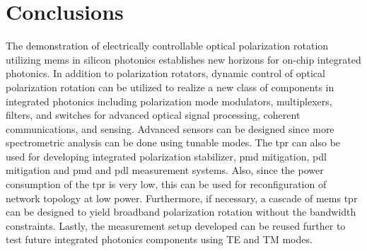 \documentclass[../report.tex]{subfiles}
\begin{document}
		
\chapter{Conclusions}

The demonstration of electrically controllable optical polarization rotation utilizing \gls{mems} in silicon photonics establishes new horizons for on-chip integrated photonics. In addition to polarization rotators, dynamic control of optical polarization rotation can be utilized to realize a new class of components in integrated photonics including polarization mode modulators, multiplexers, filters, and switches for advanced optical signal processing, coherent communications, and sensing. Advanced sensors can be designed since more spectrometric analysis can be done using tunable modes. The \gls{tpr} can also be used for developing integrated polarization stabilizer, \gls{pmd} mitigation, \gls{pdl} mitigation and \gls{pmd} and \gls{pdl} measurement systems. Also, since the power consumption of the \gls{tpr} is very low, this can be used for reconfiguration of network topology at low power. Furthermore, if necessary, a cascade of \gls{mems} \gls{tpr} can be designed to yield broadband polarization rotation without the bandwidth constraints. Lastly, the measurement setup developed can be reused further to test future integrated photonics components using TE and TM modes.
\end{document}
